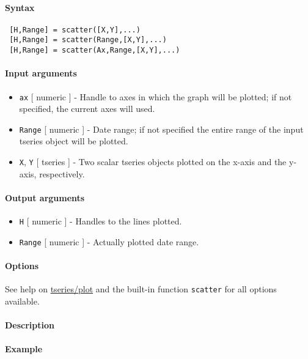 


	\paragraph{Syntax}
 
 \begin{verbatim}
 [H,Range] = scatter([X,Y],...)
 [H,Range] = scatter(Range,[X,Y],...)
 [H,Range] = scatter(Ax,Range,[X,Y],...)
 \end{verbatim}
 
 \paragraph{Input arguments}
 
 \begin{itemize}
 \item
   \texttt{ax} {[} numeric {]} - Handle to axes in which the graph will
   be plotted; if not specified, the current axes will used.
 \item
   \texttt{Range} {[} numeric {]} - Date range; if not specified the
   entire range of the input tseries object will be plotted.
 \item
   \texttt{X}, \texttt{Y} {[} tseries {]} - Two scalar tseries objects
   plotted on the x-axis and the y-axis, respectively.
 \end{itemize}
 
 \paragraph{Output arguments}
 
 \begin{itemize}
 \item
   \texttt{H} {[} numeric {]} - Handles to the lines plotted.
 \item
   \texttt{Range} {[} numeric {]} - Actually plotted date range.
 \end{itemize}
 
 \paragraph{Options}
 
 See help on \url{tseries/plot} and the built-in function
 \texttt{scatter} for all options available.
 
 \paragraph{Description}
 
 \paragraph{Example}


